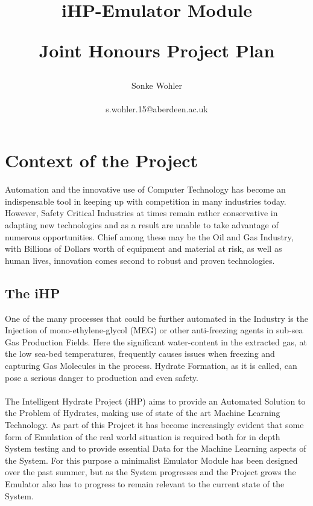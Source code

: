 \documentclass{article}
\title{
    iHP-Emulator Module
\\
\begin{small}
    Joint Honours Project Plan
\end{small} 
}
\author{Sonke Wohler \\
\begin{small}
    s.wohler.15@aberdeen.ac.uk
\end{small}
}
\date{\begin{small}
    Department of Computing Science/ Department of Physics
    \\
    University of Aberdeen
\end{small}}
\begin{document}
\maketitle
\thispagestyle{empty}

\section{Context of the Project}
Automation and the innovative use of Computer Technology has become an indispensable tool in keeping up with competition in many industries today. However, Safety Critical Industries at times remain rather conservative in adapting new technologies and as a result are unable to take advantage of numerous opportunities. Chief among these may be the Oil and Gas Industry, with Billions of Dollars worth of equipment and material at risk, as well as human lives, innovation comes second to robust and proven technologies. \cite{chickenEgg,cloudOil}

\subsection{The iHP}
One of the many processes that could be further automated in the Industry is the Injection of mono-ethylene-glycol (MEG) or other anti-freezing agents in sub-sea Gas Production Fields. Here the significant water-content in the extracted gas, at the low sea-bed temperatures, frequently causes issues when freezing and capturing Gas Molecules in the process. Hydrate Formation, as it is called, can pose a serious danger to production and even safety.\cite{dataBook,gasBook,hydrateFormation}
\\\\The Intelligent Hydrate Project (iHP) aims to provide an Automated Solution to the Problem of Hydrates, making use of state of the art Machine Learning Technology. As part of this Project it has become increasingly evident that some form of Emulation of the real world situation is required both for in depth System testing and to provide essential Data for the Machine Learning aspects of the System. For this purpose a minimalist Emulator Module has been designed over the past summer, but as the System progresses and the Project grows the Emulator also has to progress to remain relevant to the current state of the System.
\end{document}
